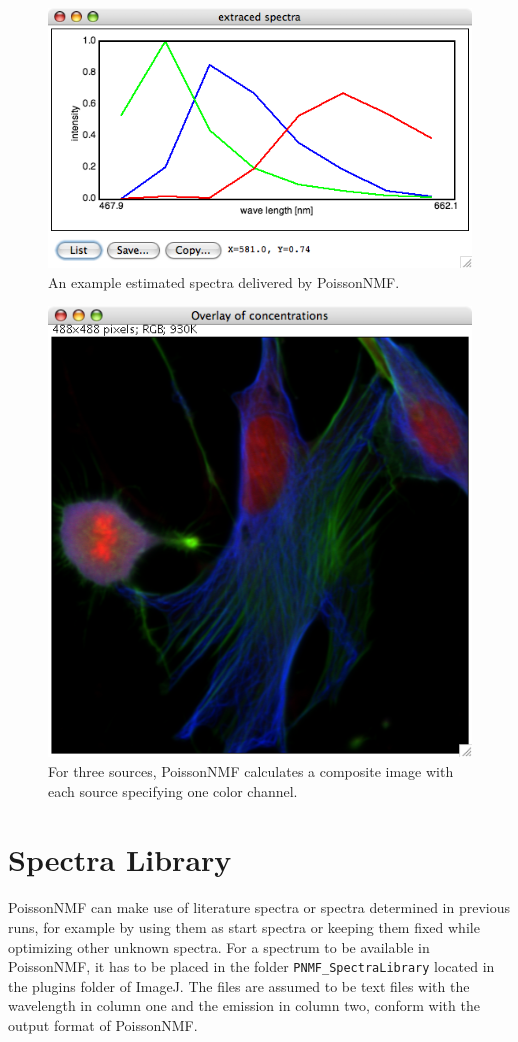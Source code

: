 \documentclass{article}
\begin{document}
\begin{figure}[htp]
\begin{center}
  \includegraphics[width=0.8\columnwidth]{spectra}
  \caption{An example estimated spectra delivered by PoissonNMF.}
  \label{fig:spectra}
\end{center}
\end{figure}
\begin{figure}[htp]
\begin{center}
  \includegraphics[width=0.9\columnwidth]{RGBoverlay}
  \caption{For three sources, PoissonNMF calculates a composite image with
  each source specifying one color channel. }
  \label{fig:RGBoverlay}
\end{center}
\end{figure}


\section*{Spectra Library}
PoissonNMF can make use of literature spectra or spectra determined in previous
runs, for example by using them as start spectra or keeping them fixed while
optimizing other unknown spectra. For a spectrum to be available in PoissonNMF,
it has to be placed in the folder \texttt{PNMF\_SpectraLibrary} located in the
plugins folder of ImageJ. The files are assumed to be text files with the
wavelength in column one and the emission in column two, conform with the
output format of PoissonNMF.


\end{document}
